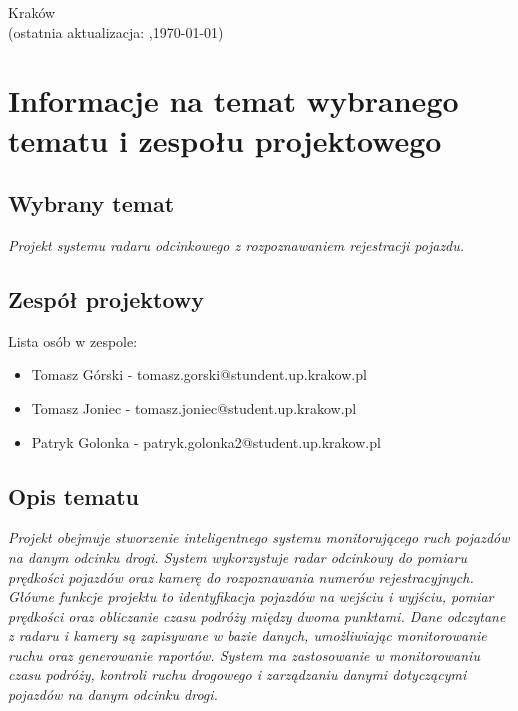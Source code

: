 \documentclass[12pt,a4paper,oneside]{article}
\theoremstyle{definition}
\numberwithin{equation}{section}
\begin{document}
\begin{titlepage}
\vspace*{\fill}
\begin{center}
\large
Kraków \the\year\\
(ostatnia aktualizacja: \DTMcurrenttime,\;\today)
\end{center}
\end{titlepage}
\setcounter{page}{0} 
\newpage\null\thispagestyle{empty}

\tableofcontents


\newpage

\section{Informacje na temat wybranego tematu i zespołu projektowego}
\subsection{Wybrany temat}
\textit{Projekt systemu radaru odcinkowego z rozpoznawaniem rejestracji pojazdu.}
\subsection{Zespół projektowy}
Lista osób w zespole:
\begin{itemize}
  \item Tomasz Górski - tomasz.gorski@stundent.up.krakow.pl
  \item Tomasz Joniec - tomasz.joniec@student.up.krakow.pl
  \item Patryk Golonka - patryk.golonka2@student.up.krakow.pl
\end{itemize}
\subsection{Opis tematu}
\textit{Projekt obejmuje stworzenie inteligentnego systemu monitorującego ruch pojazdów na danym odcinku drogi. System wykorzystuje radar odcinkowy do pomiaru prędkości pojazdów oraz kamerę do rozpoznawania numerów rejestracyjnych. Główne funkcje projektu to identyfikacja pojazdów na wejściu i wyjściu, pomiar prędkości oraz obliczanie czasu podróży między dwoma punktami. Dane odczytane z radaru i kamery są zapisywane w bazie danych, umożliwiając monitorowanie ruchu oraz generowanie raportów. System ma zastosowanie w monitorowaniu czasu podróży, kontroli ruchu drogowego i zarządzaniu danymi dotyczącymi pojazdów na danym odcinku drogi.}
\end{document}
